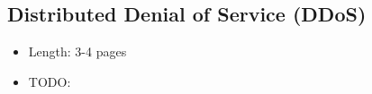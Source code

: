 \subsection{Distributed Denial of Service (DDoS)}

\begin{itemize}
  \item Length: 3-4 pages
  \item TODO:
\end{itemize}
